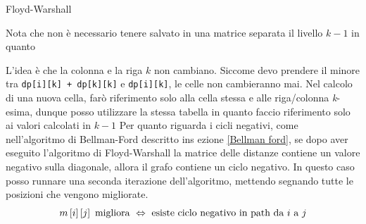 \begin{algoritmo}{Floyd-Warshall}
	\begin{algorithm}[H]
		\caption{Floyd-Warshall algorithm}
		\vskip3mm
		\vskip3mm

	\end{algorithm}
\end{algoritmo}
\vskip3mm
Nota che non è necessario tenere salvato in una matrice separata il livello $ k-1 $ in quanto

\begin{center}
\end{center}
L'idea è che la colonna e la riga $ k $ non cambiano. Siccome devo prendere il minore tra \verb|dp[i][k] + dp[k][k]| e \verb|dp[i][k]|, le celle non cambieranno mai. Nel calcolo di una nuova cella, farò riferimento solo alla cella stessa e alle riga/colonna \textit{k}-esima, dunque posso utilizzare la stessa tabella in quanto faccio riferimento solo ai valori calcolati in $ k-1 $
\vskip3mm
Per quanto riguarda i cicli negativi, come nell'algoritmo di Bellman-Ford descritto ins ezione \ref{Bellman ford}, se dopo aver eseguito l'algoritmo di Floyd-Warshall la matrice delle distanze contiene un valore negativo sulla diagonale, allora il grafo contiene un ciclo negativo. In questo caso posso runnare una seconda iterazione dell'algoritmo, mettendo segnando tutte le posizioni che vengono migliorate.
\[
	m\left[i\right]\left[j\right] \text{ migliora } \Leftrightarrow \text{ esiste ciclo negativo in path da $ i $ a $ j $}
\]

